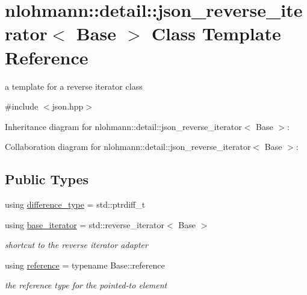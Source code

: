 \hypertarget{classnlohmann_1_1detail_1_1json__reverse__iterator}{}\section{nlohmann\+:\+:detail\+:\+:json\+\_\+reverse\+\_\+iterator$<$ Base $>$ Class Template Reference}
\label{classnlohmann_1_1detail_1_1json__reverse__iterator}


a template for a reverse iterator class  




{\ttfamily \#include $<$json.\+hpp$>$}



Inheritance diagram for nlohmann\+:\+:detail\+:\+:json\+\_\+reverse\+\_\+iterator$<$ Base $>$\+:


Collaboration diagram for nlohmann\+:\+:detail\+:\+:json\+\_\+reverse\+\_\+iterator$<$ Base $>$\+:
\subsection*{Public Types}
\begin{DoxyCompactItemize}
\item 
using \hyperlink{classnlohmann_1_1detail_1_1json__reverse__iterator_a9ab55987c05ec6427ad36082e351cc45}{difference\+\_\+type} = std\+::ptrdiff\+\_\+t
\item 
using \hyperlink{classnlohmann_1_1detail_1_1json__reverse__iterator_a6b2ef1d632fe49bfcc22fbd1abd62395}{base\+\_\+iterator} = std\+::reverse\+\_\+iterator$<$ Base $>$
\begin{DoxyCompactList}\small\item\em shortcut to the reverse iterator adapter \end{DoxyCompactList}\item 
using \hyperlink{classnlohmann_1_1detail_1_1json__reverse__iterator_a42f51a69bac7b2aebb613b2164e457f1}{reference} = typename Base\+::reference
\begin{DoxyCompactList}\small\item\em the reference type for the pointed-\/to element \end{DoxyCompactList}\end{DoxyCompactItemize}

